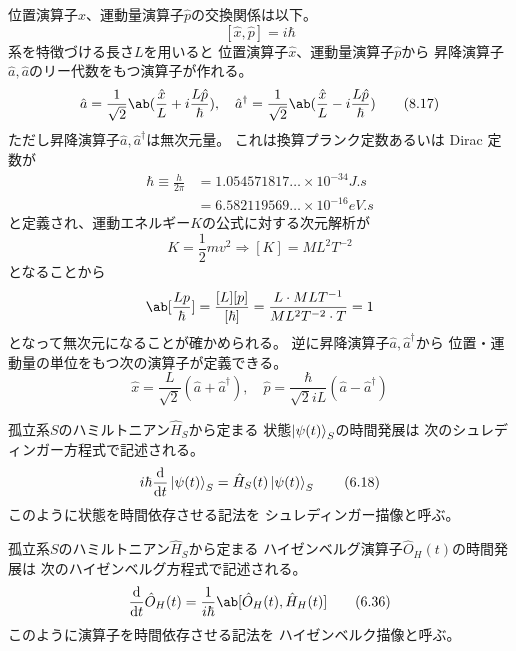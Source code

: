位置演算子$\hat{x}$、運動量演算子$\hat{p}$の交換関係は以下。
\begin{equation}
  \label{eq:xp_alg}
  [\hat{x},\hat{p}]=i\hbar
  \tag{8.18}
\end{equation}
系を特徴づける長さ$L$を用いると
位置演算子$\hat{x}$、運動量演算子$\hat{p}$から
昇降演算子$\hat{a},\hat{a}$のリー代数をもつ演算子が作れる。
\begin{equation}
  \label{eq:xp2a}
  \hat{a}=\frac{1}{\sqrt{2}}
  \ab(\frac{\hat{x}}{L}+i\frac{L\hat{p}}{\hbar}),\quad
  \hat{a}^\dagger=\frac{1}{\sqrt{2}}
  \ab(\frac{\hat{x}}{L}-i\frac{L\hat{p}}{\hbar})
  \tag{8.17}
\end{equation}
ただし昇降演算子$\hat{a},\hat{a}^\dagger$は無次元量。
これは換算プランク定数あるいは Dirac 定数が
\begin{equation}
  \begin{split}
    \hbar\equiv\frac{h}{2\pi}
    &= 1.054571817\ldots\times10^{-34}\si{J.s} \\
    &= 6.582119569\ldots\times10^{-16}\si{eV.s}
  \end{split}
\end{equation}
と定義され、運動エネルギー$K$の公式に対する次元解析が
\begin{equation}
  K=\frac{1}{2}mv^2
  \Rightarrow[K]=ML^2T^{-2}
\end{equation}
となることから
\begin{equation}
  \ab[\frac{Lp}{\hbar}]
  =\frac{[L][p]}{[\hbar]}
  =\frac{L\cdot MLT^{-1}}{ML^2T^{-2}\cdot T}
  = 1
\end{equation}
となって無次元になることが確かめられる。
逆に昇降演算子$\hat{a},\hat{a}^\dagger$から
位置・運動量の単位をもつ次の演算子が定義できる。
\begin{equation}
  \label{eq:a2xp}
  \hat{x}=\frac{L}{\sqrt{2}}(\hat{a}+\hat{a}^\dagger),\quad
  \hat{p}=\frac{\hbar}{\sqrt{2}iL}(\hat{a}-\hat{a}^\dagger)
  \tag{8.16}
\end{equation}

孤立系$S$のハミルトニアン$\hat{H}_S$から定まる
状態$\ket{\psi(t)}_S$の時間発展は
次のシュレディンガー方程式で記述される。
\begin{equation}
  \label{eq:schrodinger_eq}
  i\hbar\odv{}{t}\ket{\psi(t)}_S
  =\hat{H}_S(t)\ket{\psi(t)}_S
  \tag{6.18}
\end{equation}
このように状態を時間依存させる記法を
シュレディンガー描像と呼ぶ。

孤立系$S$のハミルトニアン$\hat{H}_S$から定まる
ハイゼンベルグ演算子$\hat{O}_H(t)$の時間発展は
次のハイゼンベルグ方程式で記述される。
\begin{equation}
  \label{eq:heisenberg_eq}
  \odv{}{t}\hat{O}_H(t)
  =\frac{1}{i\hbar}\ab[\hat{O}_H(t),\hat{H}_H(t)]
  \tag{6.36}
\end{equation}
このように演算子を時間依存させる記法を
ハイゼンベルク描像と呼ぶ。

